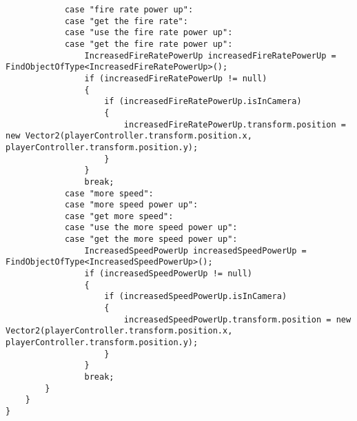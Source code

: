 \documentclass{article}
\begin{document}
\begin{verbatim}
            case "fire rate power up":
            case "get the fire rate":
            case "use the fire rate power up":
            case "get the fire rate power up":
                IncreasedFireRatePowerUp increasedFireRatePowerUp = FindObjectOfType<IncreasedFireRatePowerUp>();
                if (increasedFireRatePowerUp != null)
                {
                    if (increasedFireRatePowerUp.isInCamera)
                    {
                        increasedFireRatePowerUp.transform.position = new Vector2(playerController.transform.position.x, playerController.transform.position.y);
                    }
                }
                break;
            case "more speed":
            case "more speed power up":
            case "get more speed":
            case "use the more speed power up":
            case "get the more speed power up":
                IncreasedSpeedPowerUp increasedSpeedPowerUp = FindObjectOfType<IncreasedSpeedPowerUp>();
                if (increasedSpeedPowerUp != null)
                {
                    if (increasedSpeedPowerUp.isInCamera)
                    {
                        increasedSpeedPowerUp.transform.position = new Vector2(playerController.transform.position.x, playerController.transform.position.y);
                    }
                }
                break;
        }
    }
}
\end{verbatim}
\end{document}
